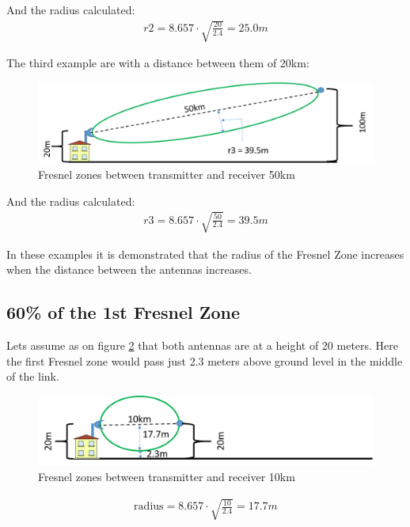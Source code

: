 And the radius calculated:
\begin{align*}
r2 = 8.657\cdot \sqrt{\frac{20}{2.4}} = 25.0m
\end{align*}

The third example are with a distance between them of 20km:

\begin{figure}[H]
	\centering
	\includegraphics[scale=0.50]{figures/fresnel_50km.png}
	\caption{Fresnel zones between transmitter and receiver 50km}
	\label{fig:fresnel_zones_50km}
\end{figure}  

And the radius calculated:
\begin{align*}
r3 = 8.657\cdot \sqrt{\frac{50}{2.4}} = 39.5m
\end{align*}

\noindent In these examples it is demonstrated that the radius of the Fresnel Zone increases when the distance between the antennas increases.

\subsection{60\% of the 1st Fresnel Zone}
Lets assume as on figure \ref{fig:fresnel_zones_10km_height} that both antennas are at a height of 20 meters. Here the first Fresnel zone would pass just 2.3 meters above ground level in the middle of the link. 

\begin{figure}[H]
	\centering
	\includegraphics[scale=0.50]{figures/fresnel_10km_height.png}
	\caption{Fresnel zones between transmitter and receiver 10km}
	\label{fig:fresnel_zones_10km_height}
\end{figure}  

\begin{align*}
\text{radius} = 8.657\cdot \sqrt{\frac{10}{2.4}} = 17.7m
\end{align*}

